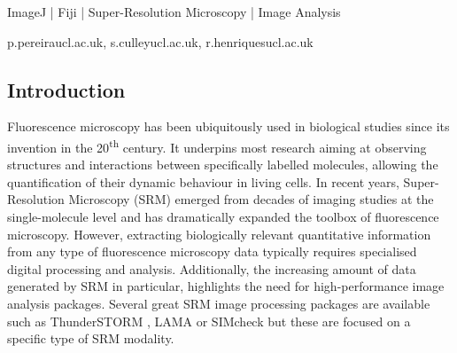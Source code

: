 \begin{keywords}
    ImageJ | Fiji | Super-Resolution Microscopy | Image Analysis
\end{keywords}

\begin{corrauthor}
    p.pereira\at ucl.ac.uk, s.culley\at ucl.ac.uk, r.henriques\at ucl.ac.uk
\end{corrauthor}


\subsection*{Introduction}
  Fluorescence microscopy has been ubiquitously used in biological studies since its invention in the 20\textsuperscript{th} century. It underpins most research aiming at observing structures and interactions between specifically labelled molecules, allowing the quantification of their dynamic behaviour in living cells. In recent years, Super-Resolution Microscopy (SRM) emerged from decades of imaging studies at the single-molecule level and has dramatically expanded the toolbox of fluorescence microscopy. However, extracting biologically relevant quantitative information from any type of fluorescence microscopy data typically requires specialised digital processing and analysis. Additionally, the increasing amount of data generated by SRM in particular, highlights the need for high-performance image analysis packages.  Several great SRM image processing packages are available such as ThunderSTORM \cite{ovesny2014thunderstorm}, LAMA \cite{Malkusch2016LAMA} or SIMcheck \cite{schermelleh2015simcheck} but these are focused on a specific type of SRM modality.
  
